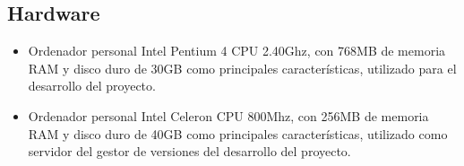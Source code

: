 \subsection{Hardware}

\begin{itemize}
   \item Ordenador personal Intel Pentium 4 CPU 2.40Ghz, con 768MB de memoria
   RAM y disco duro de 30GB como principales características, utilizado para el
   desarrollo del proyecto.
   \item Ordenador personal Intel Celeron CPU 800Mhz, con 256MB de memoria RAM y
   disco duro de 40GB como principales características, utilizado como servidor
   del gestor de versiones del desarrollo del proyecto.
\end{itemize}